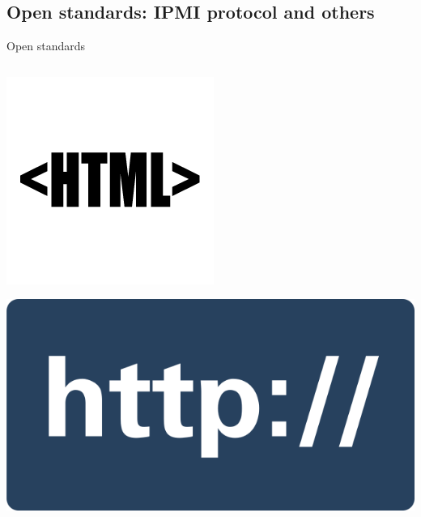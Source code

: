 \documentclass{beamer}
\begin{document}
  \subsection{ Open standards: IPMI protocol and others}
	\begin{frame}{Open standards}

		\begin{columns}[onlytextwidth]
			\begin{column}{0.2\textwidth}
				\includegraphics[width=\textwidth]{logo/html.png}

				\includegraphics[width=\textwidth]{logo/http.png}


\end{column}
\end{columns}
\end{frame}
\end{document}
